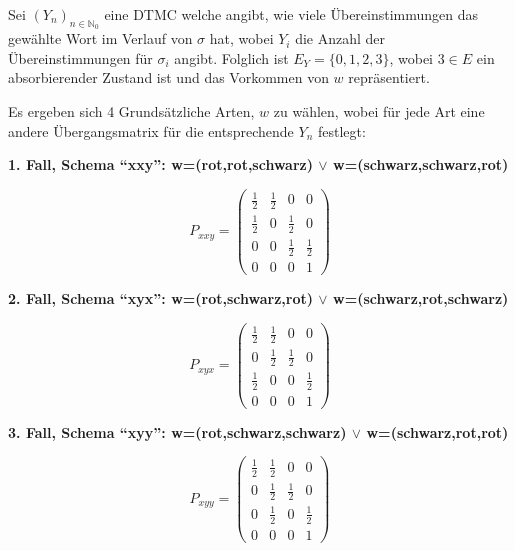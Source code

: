 \documentclass[a4paper]{scrartcl}
\newcommand{\N}{\mathbb{N}}
\def \blattnr {2}
\begin{document}
\begin{enumerate}[label=\bfseries \blattnr.\arabic*]
\begin{enumerate}[label=\alph*)]
		Sei $(Y_n)_{n\in\N_0}$ eine DTMC welche angibt, wie viele Übereinstimmungen das gewählte
		Wort im Verlauf von $\sigma$ hat, wobei $Y_i$ die Anzahl der Übereinstimmungen für 
		$\sigma_i$ angibt. Folglich ist $E_Y = \{0,1,2,3\}$, wobei $3\in E$ ein absorbierender 
		Zustand ist und das Vorkommen von $w$ repräsentiert.
		
		Es ergeben sich 4 Grundsätzliche Arten, $w$ zu wählen, wobei für jede Art eine andere
		Übergangsmatrix für die entsprechende $Y_n$ festlegt:
		
		\textbf{1. Fall, Schema ``xxy'': w=(rot,rot,schwarz) $\vee$ w=(schwarz,schwarz,rot)}
		
		\begin{equation*}
                    P_{xxy} =
                    \begin{pmatrix}
                        \frac12 & \frac12 & 0 & 0 \\
                        \frac12 & 0 & \frac12 & 0 \\
                        0 & 0 & \frac12 & \frac12 \\
                        0 & 0 & 0 & 1
                    \end{pmatrix}
                \end{equation*}
                
                \textbf{2. Fall, Schema ``xyx'': w=(rot,schwarz,rot) $\vee$ w=(schwarz,rot,schwarz)}
                
                \begin{equation*}
                    P_{xyx} =
                    \begin{pmatrix}
                        \frac12 & \frac12 & 0 & 0 \\
                        0 & \frac12 & \frac12 & 0 \\
                        \frac12 & 0 & 0 & \frac12 \\
                        0 & 0 & 0 & 1
                    \end{pmatrix}
                \end{equation*}
                
                \textbf{3. Fall, Schema ``xyy'': w=(rot,schwarz,schwarz) $\vee$ w=(schwarz,rot,rot)}
                
                \begin{equation*}
                    P_{xyy} =
                    \begin{pmatrix}
                        \frac12 & \frac12 & 0 & 0 \\
                        0 & \frac12 & \frac12 & 0 \\
                        0 & \frac12 & 0 & \frac12 \\
                        0 & 0 & 0 & 1
                    \end{pmatrix}
                \end{equation*}
                

\end{enumerate}
\end{enumerate}
\end{document}
